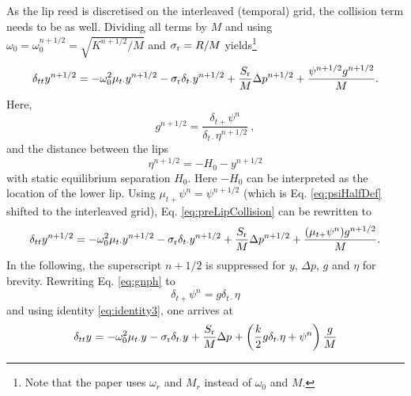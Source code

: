As the lip reed is discretised on the interleaved (temporal) grid, the collision term needs to be as well. Dividing all terms by $M$ and using $\omega_0 = \omega_0^{n+1/2} = \sqrt{K^{n+1/2}/M}$ and $\sigma_{\text{r}} = R/M$ yields\footnote{Note that the paper uses $\omega_r$ and $M_r$ instead of $\omega_0$ and $M$.}
\begin{equation}\label{eq:preLipCollision}
    \delta_{tt}y^{n+1/2} = -\omega_0^2\mu_{t\cdot}y^{n+1/2}-\sigma_\text{r}\delta_{t\cdot}y^{n+1/2} + \frac{S_\text{r}}{M}\Delta p^{n+1/2} + \frac{\psi^{n+1/2}g^{n+1/2}}{M}.
\end{equation}
Here,
\begin{equation}\label{eq:gnph}
    g^{n+1/2} = \frac{\delta_{t+}\psi^n}{\delta_{t\cdot}\eta^{n+1/2}}\ ,
\end{equation}
and the distance between the lips
\begin{equation}\label{eq:etaBarrier}
    \eta^{n+1/2} = -H_0 - y^{n+1/2}
\end{equation}
with static equilibrium separation $H_0$. Here $-H_0$ can be interpreted as the location of the lower lip.
Using $\mu_{t+}\psi^n = \psi^{n+1/2}$ (which is Eq. \eqref{eq:psiHalfDef} shifted to the interleaved grid), Eq. \eqref{eq:preLipCollision} can be rewritten to
\begin{equation*}
    \delta_{tt}y^{n+1/2} = -\omega_0^2\mu_{t\cdot}y^{n+1/2}-\sigma_\text{r}\delta_{t\cdot}y^{n+1/2} + \frac{S_\text{r}}{M}\Delta p^{n+1/2} + \frac{(\mu_{t+}\psi^n)g^{n+1/2}}{M}.
\end{equation*}
In the following, the superscript $n+1/2$ is suppressed for $y$, $\Delta p$, $g$ and $\eta$ for brevity. Rewriting Eq. \eqref{eq:gnph} to
\begin{equation}\label{eq:rewrittenPsi}
    \delta_{t+}\psi^n = g\delta_{t\cdot}\eta
\end{equation}
and using identity \eqref{eq:identity3}, one arrives at
\begin{equation}\label{eq:lipReedFDSCollision}
    \delta_{tt}y^{} = -\omega_0^2\mu_{t\cdot}y^{}-\sigma_\text{r}\delta_{t\cdot}y^{} + \frac{S_\text{r}}{M}\Delta p^{} + \left(\frac{k}{2}g\delta_{t\cdot}\eta + \psi^n\right)\frac{g}{M}
\end{equation}
